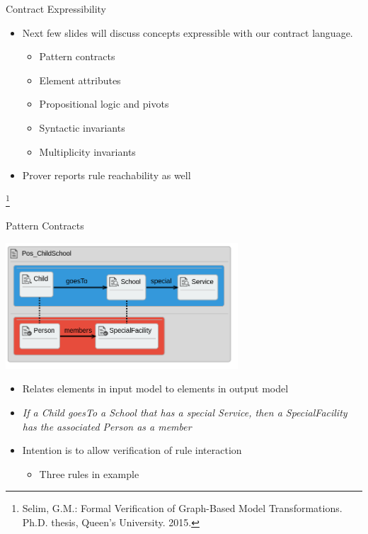 \documentclass[xcolor=dvipsnames, 12pt, handout]{beamer}
\newcommand\blfootnote[1]{%
  \begingroup
  \renewcommand\thefootnote{}\footnote{#1}%
  \addtocounter{footnote}{-1}%
  \endgroup
}
\begin{document}
\begin{frame}{Contract Expressibility}

\begin{itemize}[<+->]
\item Next few slides will discuss concepts expressible with our contract language.

\begin{itemize}[<+->]
\item Pattern contracts
\item Element attributes
\item Propositional logic and pivots
\item Syntactic invariants
\item Multiplicity invariants
\end{itemize}
\end{itemize}

\begin{itemize}
\item Prover reports rule reachability as well
\end{itemize}

\blfootnote{Selim, G.M.: Formal Verification of Graph-Based Model Transformations. Ph.D. thesis, Queen’s University. 2015.}
\end{frame}

\begin{frame}{Pattern Contracts}
\begin{center}
\includegraphics[width=0.65\textwidth]{figures/Pos_ChildSchool}
\end{center}
\begin{itemize}
\item Relates elements in input model to elements in output model
\item \textit{If a Child goesTo a School that has a special Service, then a SpecialFacility has the associated Person as a member}
\item Intention is to allow verification of rule interaction
\begin{itemize}
\item Three rules in example
\end{itemize}
\end{itemize}
\end{frame}
\end{document}

